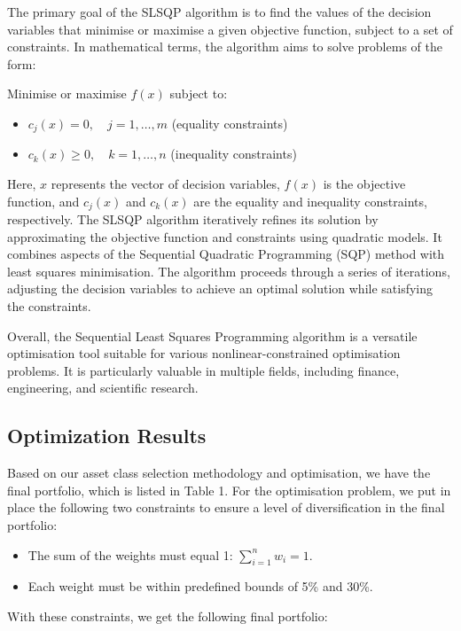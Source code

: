\documentclass{article}
\begin{document}
The primary goal of the SLSQP algorithm is to find the values of the decision variables that minimise or maximise a given objective function, subject to a set of constraints. In mathematical terms, the algorithm aims to solve problems of the form:

Minimise or maximise \( f(x) \) subject to:
\begin{itemize}
    \item \( c_j(x) = 0, \quad j = 1, \ldots, m \) (equality constraints)
    \item \( c_k(x) \geq 0, \quad k = 1, \ldots, n \) (inequality constraints)
\end{itemize}

Here, \( x \) represents the vector of decision variables, \( f(x) \) is the objective function, and \( c_j(x) \) and \( c_k(x) \) are the equality and inequality constraints, respectively.
The SLSQP algorithm iteratively refines its solution by approximating the objective function and constraints using quadratic models. It combines aspects of the Sequential Quadratic Programming (SQP) method with least squares minimisation. The algorithm proceeds through a series of iterations, adjusting the decision variables to achieve an optimal solution while satisfying the constraints.

Overall, the Sequential Least Squares Programming algorithm is a versatile optimisation tool suitable for various nonlinear-constrained optimisation problems. It is particularly valuable in multiple fields, including finance, engineering, and scientific research.

\subsection{Optimization Results}

Based on our asset class selection methodology and optimisation, we have the final portfolio, which is listed in Table 1. For the optimisation problem, we put in place the following two constraints to ensure a level of diversification in the final portfolio:

\begin{itemize}
    \item The sum of the weights must equal 1: \( \sum_{i=1}^{n} w_i = 1 \).
    \item Each weight must be within predefined bounds of 5\% and 30\%.
\end{itemize}

With these constraints, we get the following final portfolio:
\end{document}
